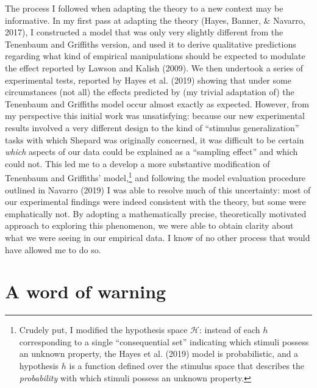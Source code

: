 \documentclass[
  english,
  doc]{apa6}
\begin{document}
The process I followed when adapting the theory to a new context may be informative. In my first pass at adapting the theory (Hayes, Banner, \& Navarro, 2017), I constructed a model that was only very slightly different from the Tenenbaum and Griffiths version, and used it to derive qualitative predictions regarding what kind of empirical manipulations should be expected to modulate the effect reported by Lawson and Kalish (2009). We then undertook a series of experimental tests, reported by Hayes et al. (2019) showing that under some circumstances (not all) the effects predicted by (my trivial adaptation of) the Tenenbaum and Griffiths model occur almost exactly as expected. However, from my perspective this initial work was unsatisfying: because our new experimental results involved a very different design to the kind of \enquote{stimulus generalization} tasks with which Shepard was originally concerned, it was difficult to be certain \emph{which} aspects of our data could be explained as a \enquote{sampling effect} and which could not. This led me to a develop a more substantive modification of Tenenbaum and Griffiths' model,\footnote{Crudely put, I modified the hypothesis space \(\mathcal{H}\): instead of each \(h\) corresponding to a single \enquote{consequential set} indicating which stimuli possess an unknown property, the Hayes et al. (2019) model is probabilistic, and a hypothesis \(h\) is a function defined over the stimulus space that describes the \emph{probability} with which stimuli possess an unknown property.} and following the model evaluation procedure outlined in Navarro (2019) I was able to resolve much of this uncertainty: most of our experimental findings were indeed consistent with the theory, but some were emphatically not. By adopting a mathematically precise, theoretically motivated approach to exploring this phenomenon, we were able to obtain clarity about what we were seeing in our empirical data. I know of no other process that would have allowed me to do so.

\hypertarget{a-word-of-warning}{%
\section{A word of warning}\label{a-word-of-warning}}
\end{document}
